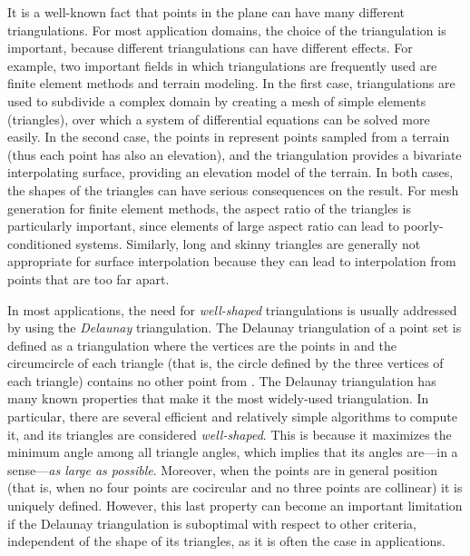 \documentclass {journal}
\begin{document}
It is a well-known fact that  points in the plane can have many different triangulations.
For most application domains, the choice of the triangulation is important, because different triangulations can have different effects.
For example, two important fields in which triangulations are frequently used are finite element methods and terrain modeling.
In the first case, triangulations are used to subdivide a complex domain by creating a mesh of simple elements (triangles), over which a system of differential equations can be solved more easily.
In the second case, the points in  represent points sampled from a terrain (thus each point has also an elevation), and the triangulation provides a bivariate interpolating surface, providing an elevation model of the terrain.
In both cases, the shapes of the triangles can have serious consequences on the result.
For mesh generation for finite element methods, the aspect ratio of the triangles is particularly important, since elements of large aspect ratio can lead to poorly-conditioned systems.
Similarly, long and skinny triangles are generally not appropriate for surface interpolation because they can lead to interpolation from points that are too far apart.

In most applications, the need for \emph{well-shaped}
triangulations is usually addressed by using the \emph{Delaunay}
triangulation. The Delaunay triangulation of a point set  is
defined as a triangulation where the vertices are the points in
 and the circumcircle of each triangle (that is, the circle
defined by the three vertices of each triangle) contains no other
point from . The Delaunay triangulation has many known
properties that make it the most widely-used triangulation. In
particular, there are several efficient and relatively simple
algorithms to compute it, and its triangles are considered
\emph{well-shaped}. This is because it maximizes the minimum angle
among all triangle angles, which implies that its angles are---in
a sense---\emph{as large as possible}. Moreover, when the points
are in general position (that is, when no four points are
cocircular and no three points are collinear) it is uniquely
defined. However, this last property can become an important
limitation if the Delaunay triangulation is suboptimal with
respect to other criteria, independent of the shape of its
triangles, as it is often the case in applications.
\end{document}
